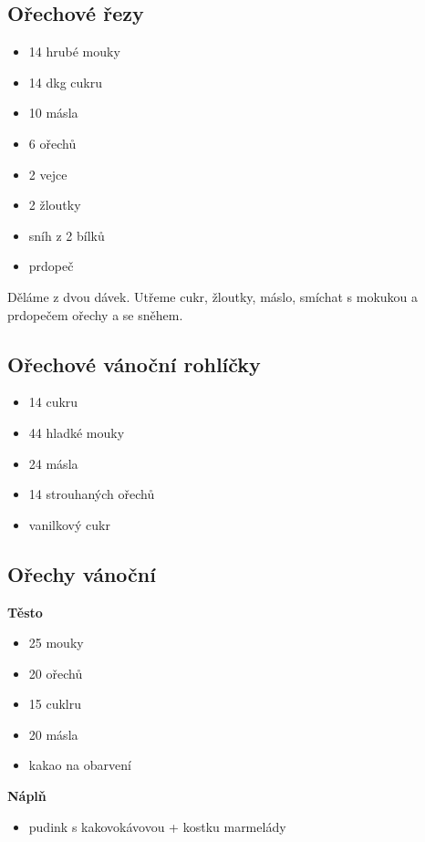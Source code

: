 \documentclass[10pt,a4paper]{article}
\newenvironment{myitemize}
{ \begin{itemize}
    \setlength{\itemsep}{0pt}
    \setlength{\parskip}{0pt}
    \setlength{\parsep}{0pt}     }
{ \end{itemize}                  }
\begin{document}
\subsection{Ořechové řezy}
\begin{minipage}[t]{0,5\textwidth}
\begin{myitemize} 
\item 14 hrubé mouky
\item 14 dkg cukru
\item 10 másla
\item 6 ořechů
\item 2 vejce
\item 2 žloutky
\item sníh z 2 bílků
\item prdopeč
\end{myitemize}
\end{minipage}
\begin{minipage}[t]{0,5\textwidth}
Děláme z dvou dávek. Utřeme cukr, žloutky, máslo, smíchat s mokukou a prdopečem ořechy a se sněhem.
\end{minipage}
\subsection{Ořechové vánoční rohlíčky}
\begin{minipage}[t]{0,5\textwidth}
\begin{myitemize} 
\item 14 cukru
\item 44 hladké mouky
\item 24 másla
\item 14 strouhaných ořechů
\item vanilkový cukr
\end{myitemize}
\end{minipage}
\begin{minipage}[t]{0,5\textwidth}

\end{minipage}
\subsection{Ořechy vánoční}
\begin{minipage}[t]{0,5\textwidth}
\textbf{Těsto}
\begin{myitemize} 
\item 25 mouky
\item 20 ořechů
\item 15 cuklru
\item 20 másla
\item kakao na obarvení
\end{myitemize}
\end{minipage}
\begin{minipage}[t]{0,5\textwidth}
\textbf{Náplň}
\begin{myitemize} 
\item pudink s kakovokávovou + kostku marmelády
\end{myitemize}
\end{minipage}
\end{document}

